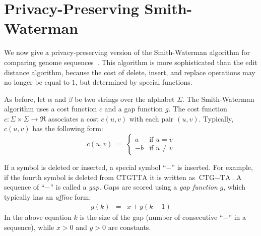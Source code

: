 

\section{Privacy-Preserving Smith-Waterman}

We now give a privacy-preserving version of the Smith-Waterman algorithm
for comparing genome sequences~\cite{Smith-Waterman}.  This algorithm is
more sophisticated than the edit distance algorithm, because the cost of
{\sf delete}, {\sf insert}, and {\sf replace} operations may no longer
be equal to $1$, but determined by special functions.

As before, let $\alpha$ and $\beta$ be two strings over the alphabet
$\Sigma$. The Smith-Waterman algorithm uses a cost function $c$ and a gap
function $g$.  The cost function $c: \Sigma \times \Sigma \rightarrow \Re$
associates a cost $c(u,v)$ with each pair $(u,v)$. Typically, $c(u,v)$
has the following form:
\[
c(u,v) \; = \; \left\{ 
\begin{array}{lr}
a & \mbox{if $u=v$} \\
-b & \mbox{if $u \not= v$} 
\end{array}
\right.
\]

If a symbol is deleted or inserted, a special symbol ``$-$'' is inserted.
For example, if the fourth symbol is deleted from $\mbox{CTGTTA}$ it is
written as $\mbox{CTG$-$TA}$. A sequence of ``$-$'' is called a {\it gap}.
Gaps are scored using a {\it gap function} $g$, which typically has an
{\it affine} form:
\begin{eqnarray*}
g(k) & = & x + y (k-1)
\end{eqnarray*}
In the above equation $k$ is the size of the gap (number of consecutive
``$-$'' in a sequence), while $x > 0$ and $y > 0$ are constants.

